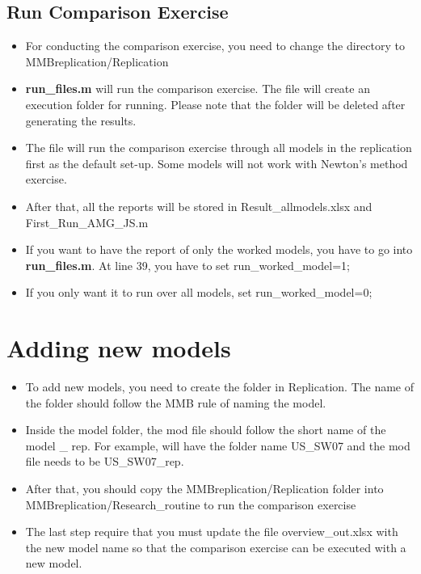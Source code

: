 \documentclass[10pt,a4paper]{article}
\begin{document}
	\subsection{Run Comparison Exercise}
	\begin{itemize}
		\item For conducting the comparison exercise, you need to change the directory to  MMB\textunderscore replication/Replication
		\medskip
		
		\item \textbf{run\_files.m} will run the comparison exercise. The file will create an execution folder for running. Please note that the folder will be deleted after generating the results.
		\medskip
		\item The file will run the comparison exercise through all models in the replication first as the default set-up. Some models will not work with Newton's method exercise.
		\medskip
		\item After that, all the reports will be stored in Result\_allmodels.xlsx and First\_Run\_AMG\_JS.m
		\medskip
		\item If you want to have the report of only the worked models, you have to go into \textbf{run\_files.m}. At line 39, you have to set run\_worked\_model=1;
		\medskip
		\item If you only want it to run over all models, set run\_worked\_model=0;
	\end{itemize}

	
\section{Adding new models}
\medskip
\begin{itemize}
	\item To add new models, you need to create the folder in Replication. The name of the folder should follow the MMB rule of naming the model.
	\medskip
	\item Inside the model folder, the mod file should follow the short name of the model \_ rep. For example, \cite{SmetsWouters2007} will have the folder name US\_SW07 and the mod file needs to be US\_SW07\_rep.
	\medskip
	\item After that, you should copy the MMB\textunderscore replication/Replication folder into MMB\textunderscore replication/Research\_routine to run the comparison exercise
	\medskip
	\item The last step require that you must update the file overview\_out.xlsx with the new model name so that the comparison exercise can be executed with a new model.
\end{itemize}
	

	
	
	
\end{document}
